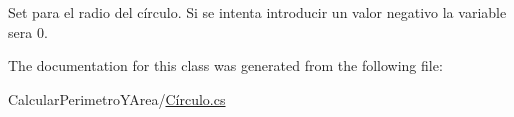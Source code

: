 Set para el radio del círculo. Si se intenta introducir un valor negativo la variable sera 0. 



The documentation for this class was generated from the following file\+:\begin{DoxyCompactItemize}
\item 
Calcular\+Perimetro\+Y\+Area/\hyperlink{_c_xC3_xADrculo_8cs}{Círculo.\+cs}\end{DoxyCompactItemize}
